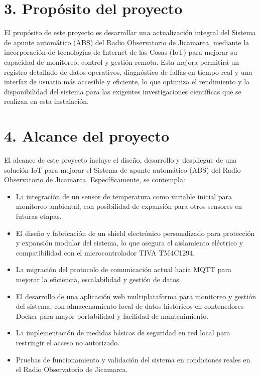 \documentclass[
11pt, %
]{charter}
\begin{document}
\section{3. Propósito del proyecto}
\label{sec:proposito}

El propósito de este proyecto es desarrollar una actualización integral del Sistema de apunte automático (ABS) del Radio Observatorio de Jicamarca, mediante la incorporación de tecnologías de Internet de las Cosas (IoT) para mejorar su capacidad de monitoreo, control y gestión remota. Esta mejora permitirá un registro detallado de datos operativos, diagnóstico de fallas en tiempo real y una interfaz de usuario más accesible y eficiente, lo que optimiza el rendimiento y la disponibilidad del sistema para las exigentes investigaciones científicas que se realizan en esta instalación.

\section{4. Alcance del proyecto}
\label{sec:alcance}

El alcance de este proyecto incluye el diseño, desarrollo y despliegue de una solución IoT para mejorar el Sistema de apunte automático (ABS) del Radio Observatorio de Jicamarca. Específicamente, se contempla:

\begin{itemize}
	\item La integración de un sensor de temperatura como variable inicial para monitoreo ambiental, con posibilidad de expansión para otros sensores en futuras etapas.

	\item El diseño y fabricación de un shield electrónico personalizado para protección y expansión modular del sistema, lo que asegura el aislamiento eléctrico y compatibilidad con el microcontrolador TIVA TM4C1294.

	\item La migración del protocolo de comunicación actual hacia MQTT para mejorar la eficiencia, escalabilidad y gestión de datos.

	\item El desarrollo de una aplicación web multiplataforma para monitoreo y gestión del sistema, con almacenamiento local de datos históricos en contenedores Docker para mayor portabilidad y facilidad de mantenimiento.

	\item La implementación de medidas básicas de seguridad en red local para restringir el acceso no autorizado.

	\item Pruebas de funcionamiento y validación del sistema en condiciones reales en el Radio Observatorio de Jicamarca.
\end{itemize}
\end{document}
